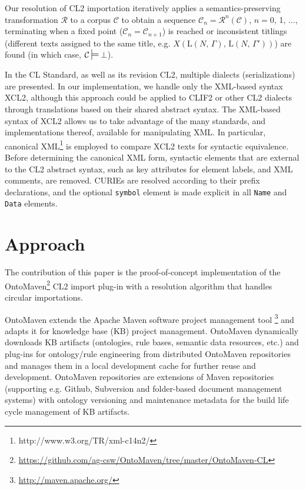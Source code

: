 \documentclass{IOS-Book-Article}
\newcommand{\corp}{ \mathcal{C} }
\newcommand{\ttlOp}[2]{\mathrm{L}(\text{$#1$, $#2$})}
\newcommand{\algo}{\mathcal{R}}
\newcommand{\algopow}[1]{\algo^{#1}}
\newcommand{\algopowone}[2]{\algopow{#1}(#2)}
\newcommand{\mdpf}{\ensuremath{\sdtstile[ss]{}{}}}
\begin{document}
Our resolution of CL2 importation iteratively applies a semantics-preserving transformation $\algo$
to a corpus $\corp$ to obtain a sequence $\corp_n = \algopowone{n}{\corp}$, $n=$0, 1, $\ldots$, terminating when a fixed point ($\corp_n = \corp_{n+1}$) is reached or inconsistent titlings (different texts assigned to the same title, e.g. $X(\text{$\ttlOp{N}{\Gamma}$, $\ttlOp{N}{\Gamma'}$})$) are found (in which case, $\corp \mdpf \bot$).

In the CL Standard, as well as its revision CL2, multiple dialects (serializations) are presented.
In our implementation, we handle only the XML-based syntax XCL2, although this approach
could be applied to CLIF2 or other CL2 dialects through translations based on their shared abstract syntax.
The XML-based syntax of XCL2 allows us to take advantage of the many standards, and implementations thereof, available for manipulating XML. 
In particular, canonical XML\footnote{http://www.w3.org/TR/xml-c14n2/} is employed to compare XCL2 texts for syntactic equivalence.
Before determining the canonical XML form, syntactic elements that are external to the CL2 abstract syntax, such as key attributes for element labels, and XML comments, are removed. CURIEs are resolved according to their prefix declarations, and the optional \texttt{symbol} element is made explicit in all \texttt{Name} and \texttt{Data} elements.


\section{Approach}
\label{approach}
The contribution of this paper is the proof-of-concept implementation of the OntoMaven\footnote{\url{https://github.com/ag-csw/OntoMaven/tree/master/OntoMaven-CL}} CL2 import plug-in with a resolution algorithm that handles circular importations. 

OntoMaven \cite{Paschke13a, Paschke13b, Paschke13c} extends the Apache Maven software project management tool \footnote{\url{http://maven.apache.org/}} and adapts it for knowledge base (KB) project management. 
OntoMaven dynamically downloads KB artifacts (ontologies, rule bases, semantic data resources, etc.) and plug-ins for ontology/rule engineering from distributed OntoMaven repositories and manages them in a local development cache for further reuse and development. 
OntoMaven repositories are extensions of Maven repositories (supporting e.g. Github, Subversion and folder-based document management systems) with ontology versioning and maintenance metadata for the build life cycle management of KB artifacts. 
\end{document}
